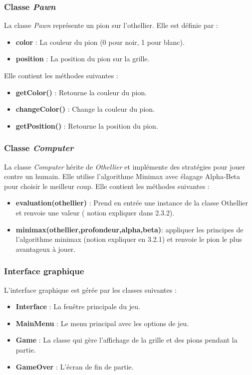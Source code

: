 \documentclass[a4paper,12pt]{article}
\begin{document}
\subsubsection{Classe \emph{Pawn}}
La classe \emph{Pawn} représente un pion sur l'othellier. Elle est définie par :
\begin{itemize}
    \item \textbf{color} : La couleur du pion (0 pour noir, 1 pour blanc).
    \item \textbf{position} : La position du pion sur la grille.
\end{itemize}
Elle contient les méthodes suivantes :
\begin{itemize}
    \item \textbf{getColor()} : Retourne la couleur du pion.
    \item \textbf{changeColor()} : Change la couleur du pion.
    \item \textbf{getPosition()} : Retourne la position du pion.
\end{itemize}

\subsubsection{Classe \emph{Computer}}
La classe \emph{Computer} hérite de \emph{Othellier} et implémente des stratégies pour jouer contre un humain. Elle utilise l'algorithme Minimax avec élagage Alpha-Beta pour choisir le meilleur coup. Elle contient les méthodes suivantes :
\begin{itemize}
    \item \textbf{evaluation(othellier)} : Prend en entrée une instance de la classe Othellier et renvoie une valeur ( notion expliquer dans 2.3.2).
    \item \textbf{minimax(othellier,profondeur,alpha,beta)}:
    appliquer les principes de l'algorithme minimax (notion expliquer en 3.2.1) et renvoie le pion le plus avantageux à jouer.
\end{itemize}

\subsubsection{Interface graphique}
L'interface graphique est gérée par les classes suivantes :
\begin{itemize}
    \item \textbf{Interface} : La fenêtre principale du jeu.
    \item \textbf{MainMenu} : Le menu principal avec les options de jeu.
    \item \textbf{Game} : La classe qui gère l'affichage de la grille et des pions pendant la partie.
    \item \textbf{GameOver} : L'écran de fin de partie.
\end{itemize}
\end{document}
